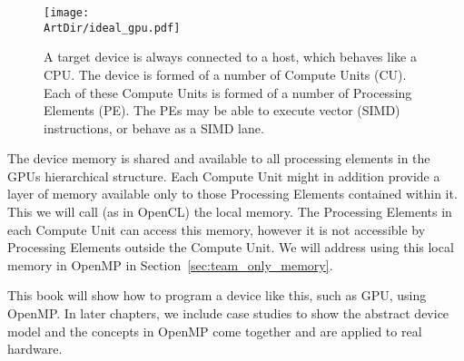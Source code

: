 \begin{figure}[t]
\centerline{\texttt{[image: \\ArtDir/ideal\_gpu.pdf]}}
\caption{A target device is always connected to a host, which behaves like a CPU. The device is formed of a number of Compute Units (CU). Each of these Compute Units is formed of a number of Processing Elements (PE). The PEs may be able to execute vector (SIMD) instructions, or behave as a SIMD lane.}
\label{figure:ideal_gpu}
\end{figure}

The device memory is shared and available to all processing elements in the GPUs hierarchical structure.
Each Compute Unit might in addition provide a layer of memory available only to those Processing Elements contained within it.
This we will call (as in OpenCL) the local memory.
The Processing Elements in each Compute Unit can access this memory, however it is not accessible by Processing Elements outside the Compute Unit.
We will address using this local memory in OpenMP in Section~\ref{sec:team_only_memory}.

This book will show how to program a device like this, such as GPU, using OpenMP.
In later chapters, we include case studies to show the abstract device model and the concepts in OpenMP come together and are applied to real hardware.





